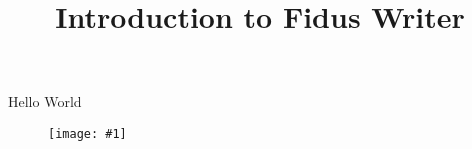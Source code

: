 \documentclass{article}
\newlength{\imgwidth}
\newcommand\scaledgraphics[2]{%
                
\settowidth{\imgwidth}{\texttt{[image: \#1]}}%
                
\setlength{\imgwidth}{\minof{\imgwidth}{#2\textwidth}}%
                
\texttt{[image: \#1]}%
                
}
\begin{document}
\title{Introduction to Fidus Writer}

\maketitle


Hello World


\begin{center}
\begin{figure}
\scaledgraphics{7030f5dc-f21d-4a0c-b860-aaf9baf2bcad.jpg}{0.5}
\label{F57026431}
\end{figure}


\end{center}


\autocite{gesis-bib-65217}


\printbibliography[title={Literaturverzeichnis}]
\end{document}
